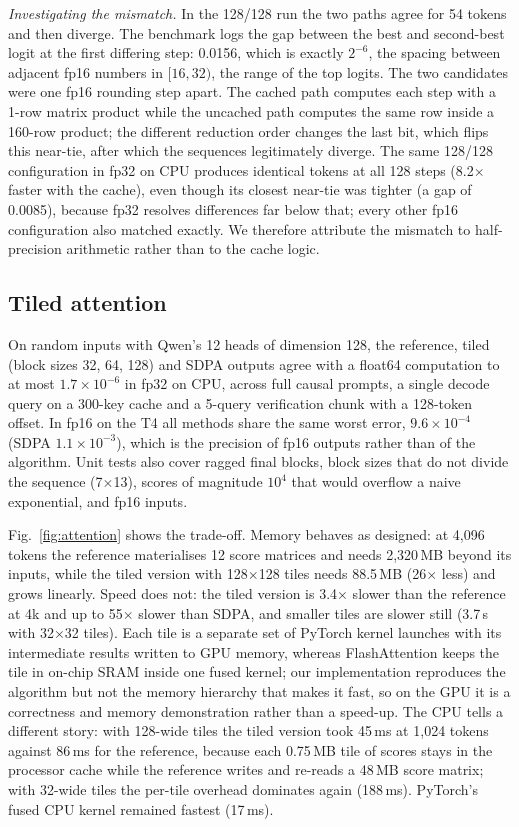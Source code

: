 \documentclass[conference]{IEEEtran}
\begin{document}
\emph{Investigating the mismatch.} In the 128/128 run the two paths agree for 54 tokens and then diverge. The benchmark logs the gap between the best and second-best logit at the first differing step: 0.0156, which is exactly $2^{-6}$, the spacing between adjacent fp16 numbers in $[16, 32)$, the range of the top logits. The two candidates were one fp16 rounding step apart. The cached path computes each step with a 1-row matrix product while the uncached path computes the same row inside a 160-row product; the different reduction order changes the last bit, which flips this near-tie, after which the sequences legitimately diverge. The same 128/128 configuration in fp32 on CPU produces identical tokens at all 128 steps (8.2$\times$ faster with the cache), even though its closest near-tie was tighter (a gap of 0.0085), because fp32 resolves differences far below that; every other fp16 configuration also matched exactly. We therefore attribute the mismatch to half-precision arithmetic rather than to the cache logic.

\subsection{Tiled attention}
On random inputs with Qwen's 12 heads of dimension 128, the reference, tiled (block sizes 32, 64, 128) and SDPA outputs agree with a float64 computation to at most $1.7\times10^{-6}$ in fp32 on CPU, across full causal prompts, a single decode query on a 300-key cache and a 5-query verification chunk with a 128-token offset. In fp16 on the T4 all methods share the same worst error, $9.6\times10^{-4}$ (SDPA $1.1\times10^{-3}$), which is the precision of fp16 outputs rather than of the algorithm. Unit tests also cover ragged final blocks, block sizes that do not divide the sequence (7$\times$13), scores of magnitude $10^4$ that would overflow a naive exponential, and fp16 inputs.

Fig.~\ref{fig:attention} shows the trade-off. Memory behaves as designed: at 4{,}096 tokens the reference materialises 12 score matrices and needs 2{,}320\,MB beyond its inputs, while the tiled version with 128$\times$128 tiles needs 88.5\,MB (26$\times$ less) and grows linearly. Speed does not: the tiled version is 3.4$\times$ slower than the reference at 4k and up to 55$\times$ slower than SDPA, and smaller tiles are slower still (3.7\,s with 32$\times$32 tiles). Each tile is a separate set of PyTorch kernel launches with its intermediate results written to GPU memory, whereas FlashAttention keeps the tile in on-chip SRAM inside one fused kernel; our implementation reproduces the algorithm but not the memory hierarchy that makes it fast, so on the GPU it is a correctness and memory demonstration rather than a speed-up. The CPU tells a different story: with 128-wide tiles the tiled version took 45\,ms at 1{,}024 tokens against 86\,ms for the reference, because each 0.75\,MB tile of scores stays in the processor cache while the reference writes and re-reads a 48\,MB score matrix; with 32-wide tiles the per-tile overhead dominates again (188\,ms). PyTorch's fused CPU kernel remained fastest (17\,ms).
\end{document}
